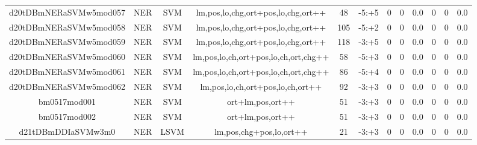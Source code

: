 \documentclass[a4paper]{article}
\begin{document}
\begin{landscape}
\begin{center}
\begin{tabular}{ |c|c|c|c|c|c|c|c|c|c|c|c|}
 
 	
 	\small{ d20tDBmNERaSVMw5mod057 } & \small{ NER} & \small{  SVM }  & lm,pos,lo,chg,ort+pos,lo,chg,ort++  &  48 &  \small{  -5:+5 }  &  0 & 0 & 0.0  &  0 & 0 & 0.0 \\
 	

 
 	
 	\small{ d20tDBmNERaSVMw5mod058 } & \small{ NER} & \small{  SVM }  & lm,pos,lo,chg,ort+pos,lo,chg,ort++  &  105 &  \small{  -5:+2 }  &  0 & 0 & 0.0  &  0 & 0 & 0.0 \\
 	

 
 	
 	\small{ d20tDBmNERaSVMw5mod059 } & \small{ NER} & \small{  SVM }  & lm,pos,lo,chg,ort+pos,lo,chg,ort++  &  118 &  \small{  -3:+5 }  &  0 & 0 & 0.0  &  0 & 0 & 0.0 \\
 	

 
 	
 	\small{ d20tDBmNERaSVMw5mod060 } & \small{ NER} & \small{  SVM }  & lm,pos,lo,ch,ort+pos,lo,ch,ort,chg++  &  58 &  \small{  -5:+3 }  &  0 & 0 & 0.0  &  0 & 0 & 0.0 \\
 	

 
 	
 	\small{ d20tDBmNERaSVMw5mod061 } & \small{ NER} & \small{  SVM }  & lm,pos,lo,ch,ort+pos,lo,ch,ort,chg++  &  86 &  \small{  -5:+4 }  &  0 & 0 & 0.0  &  0 & 0 & 0.0 \\
 	

 
 	
 	\small{ d20tDBmNERaSVMw5mod062 } & \small{ NER} & \small{  SVM }  & lm,pos,lo,ch,ort+pos,lo,ch,ort++  &  92 &  \small{  -3:+3 }  &  0 & 0 & 0.0  &  0 & 0 & 0.0 \\
 	

 
 	
 	\small{ bm0517mod001 } & \small{ NER} & \small{  SVM }  & ort+lm,pos,ort++  &  51 &  \small{  -3:+3 }  &  0 & 0 & 0.0  &  0 & 0 & 0.0 \\
 	

 
 	
 	\small{ bm0517mod002 } & \small{ NER} & \small{  SVM }  & ort+lm,pos,ort++  &  51 &  \small{  -3:+3 }  &  0 & 0 & 0.0  &  0 & 0 & 0.0 \\
 	

 
 	
 	\small{ d21tDBmDDIaSVMw3m0 } & \small{ NER} & \small{  LSVM }  & lm,pos,chg+pos,lo,ort++  &  21 &  \small{  -3:+3 }  &  0 & 0 & 0.0  &  0 & 0 & 0.0 \\
 	

 
 	

\end{tabular}
\end{center}
\end{landscape}
\end{document}
